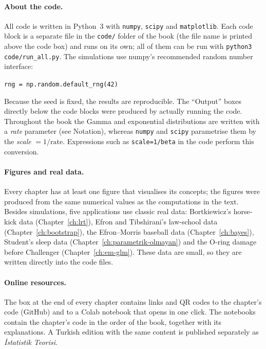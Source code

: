 \documentclass[main.tex]{subfiles}
\begin{document}
\paragraph{About the code.} All code is written in Python~3 with \texttt{numpy}, \texttt{scipy} and \texttt{matplotlib}. Each code block is a separate file in the \texttt{code/} folder of the book (the file name is printed above the code box) and runs on its own; all of them can be run with \texttt{python3 code/\allowbreak run\_all.py}. The simulations use numpy's recommended random number interface:
\begin{center}\texttt{rng = np.random.default\_rng(42)}\end{center}
Because the seed is fixed, the results are reproducible. The ``Output'' boxes directly below the code blocks were produced by actually running the code. Throughout the book the Gamma and exponential distributions are written with a \emph{rate} parameter (see Notation), whereas \texttt{numpy} and \texttt{scipy} parametrise them by the \emph{scale} $=1/\text{rate}$. Expressions such as \texttt{scale=1/beta} in the code perform this conversion.

\paragraph{Figures and real data.} Every chapter has at least one figure that visualises its concepts; the figures were produced from the same numerical values as the computations in the text. Besides simulations, five applications use classic real data: Bortkiewicz's horse-kick data (Chapter~\ref{ch:lrt}), Efron and Tibshirani's law-school data (Chapter~\ref{ch:bootstrap}), the Efron--Morris baseball data (Chapter~\ref{ch:bayes}), Student's sleep data (Chapter~\ref{ch:parametrik-olmayan}) and the O-ring damage before Challenger (Chapter~\ref{ch:em-glm}). These data are small, so they are written directly into the code files.

\paragraph{Online resources.} The box at the end of every chapter contains links and QR codes to the chapter's code (GitHub) and to a Colab notebook that opens in one click. The notebooks contain the chapter's code in the order of the book, together with its explanations. A Turkish edition with the same content is published separately as \emph{İstatistik Teorisi}.
\end{document}
